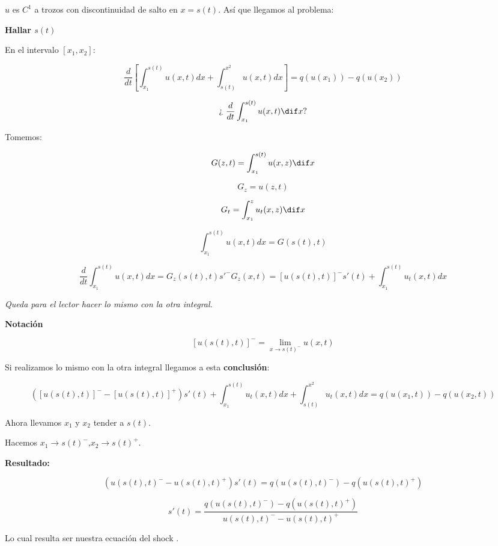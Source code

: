 		$u$ es $C^1$ a trozos con discontinuidad de salto en $x=s(t)$. Así que llegamos al problema:

		\textbf{Hallar $s(t)$}

		\begin{figure}[hbtp]
			\centering
			\caption{}
			\label{fig:discontinuidadAtasco}
		\end{figure}



		En el intervalo $[x_1,x_2]$:

		$$\frac{d}{dt} \left[ \int^{s(t)}_{x_1} u(x,t) dx + \int^{x^2}_{s(t)} u(x,t) dx \right] = q(u(x_1)) - q(u(x_2))$$


		$$ \text{¿ } \frac{d}{dt} \int^{s(t)}_{x_1} u(x,t) \dif x \text{?} $$

		Tomemos:

		$$G(z,t) = \int^{s(t)}_{x_1} u(x,z) \dif x $$

		$$G_z = u(z,t) $$

		$$G_t = \int^{z}_{x_1} u_t(x,z) \dif x $$

		$$\int^{s(t)}_{x_1} u(x,t) dx = G(s(t),t)$$

		$$\frac{d}{dt} \int^{s(t)}_{x_1} u(x,t) dx = G_z (s(t),t) s'^{-} G_z(x,t) = [u(s(t),t) ]^- s'(t) + \int^{s(t)}_{x_1} u_t(x,t) dx$$


		\textit{Queda para el lector hacer lo mismo con la otra integral.}


		\textbf{Notación}

		$$[u(s(t),t)]^{-} = \lim_{x \to s(t)^{-}} u(x, t) $$


		Si realizamos lo mismo con la otra integral llegamos a esta \textbf{conclusión}:

		$$([u(s(t),t)]^{-} - [u(s(t),t)]^{+}) s'(t) +  \int^{s(t)}_{x_1} u_t(x,t) dx + \int^{x^2}_{s(t)} u_t(x,t) dx = q(u(x_1,t)) - q(u(x_2,t)) $$

		Ahora llevamos $x_1$ y $x_2$ tender a $s(t)$.

		Hacemos $x_1 \rightarrow s(t)^{-}$,$x_2 \rightarrow s(t)^{+}$.


		\textbf{Resultado:}

		$$(u(s(t),t)^{-} - u(s(t),t)^{+}) s'(t) = q(u(s(t),t)^{-}) - q(u(s(t),t)^{+})$$

		$$s'(t) = \frac{q(u(s(t),t)^{-}) - q(u(s(t),t)^{+})}{u(s(t),t)^{-} - u(s(t),t)^{+}} $$

		Lo cual resulta ser nuestra ecuación del shock .

